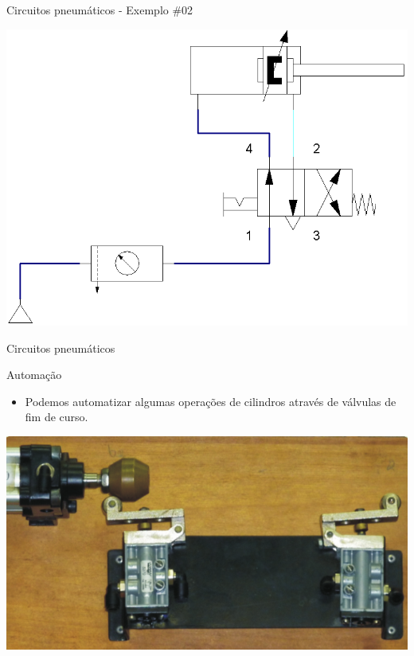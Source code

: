 \begin{frame}{Circuitos pneumáticos - Exemplo \#02}
	
	\centering
	\includegraphics[width=0.8\linewidth]{Figuras/Ch14/fig42n2}
	
\end{frame}


\begin{frame}{Circuitos pneumáticos}
	\begin{block}{Automação}
		\begin{itemize}
			\item Podemos automatizar algumas operações de cilindros através de válvulas de fim de curso.
		\end{itemize}
	\end{block}
	
	\medskip
	
	\centering
	\includegraphics[width=0.8\linewidth]{Figuras/Ch14/fig43}
	
\end{frame}


